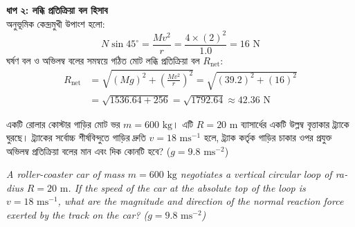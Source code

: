 \documentclass[12pt, a4paper]{article}
\begin{document}
{\begin{tcolorbox}[solutionbox={সমাধান (Solution)}]
\vspace{0.5em}
\noindent
\noindent
\textbf{ধাপ ২: লব্ধি প্রতিক্রিয়া বল হিসাব} \\[0.5em]
অনুভূমিক কেন্দ্রমুখী উপাংশ হলো:
\[ N \sin 45^\circ = \frac{M v^2}{r} = \frac{4 \times (2)^2}{1.0} = 16\text{ N} \]
ঘর্ষণ বল ও অভিলম্ব বলের সমন্বয়ে গঠিত মোট লব্ধি প্রতিক্রিয়া বল $R_{\text{net}}$:
\[
\begin{aligned}
R_{\text{net}} &= \sqrt{(M g)^2 + \left(\frac{M v^2}{r}\right)^2} = \sqrt{(39.2)^2 + (16)^2} \\
&= \sqrt{1536.64 + 256} = \sqrt{1792.64} \approx 42.36\text{ N}
\end{aligned}
\]
\end{tcolorbox}

\begin{tcolorbox}[questionbox={প্রশ্ন (Question) 12}]
\noindent
একটি রোলার কোস্টার গাড়ির মোট ভর $m = 600\text{ kg}$। এটি $R = 20\text{ m}$ ব্যাসার্ধের একটি উল্লম্ব বৃত্তাকার ট্র্যাকে ঘুরছে। ট্র্যাকের সর্বোচ্চ শীর্ষবিন্দুতে গাড়ির দ্রুতি $v = 18\text{ ms}^{-1}$ হলে, ট্র্যাক কর্তৃক গাড়ির চাকার ওপর প্রযুক্ত অভিলম্ব প্রতিক্রিয়া বলের মান এবং দিক কোনটি হবে? ($g = 9.8\text{ ms}^{-2}$)

\vspace{0.8em}
\begin{english}
\noindent\textit{\color{darkgray}
A roller-coaster car of mass $m = 600\text{ kg}$ negotiates a vertical circular loop of radius $R = 20\text{ m}$. If the speed of the car at the absolute top of the loop is $v = 18\text{ ms}^{-1}$, what are the magnitude and direction of the normal reaction force exerted by the track on the car? ($g = 9.8\text{ ms}^{-2}$)
}
\end{english}
\end{tcolorbox}

\vspace{1em}
\begin{center}
\end{center}}
\end{document}
